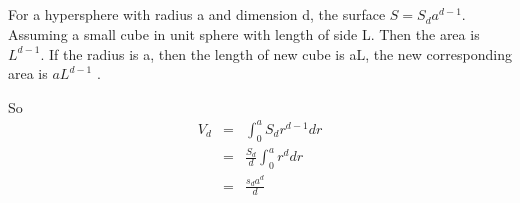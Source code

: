 \documentclass{article} %
\begin{document}







\subsection{}

For a hypersphere with radius a and dimension d, the surface $S = S_d a ^{d-1}$. Assuming a small cube in unit sphere with length of side L. Then the area is $L^{d-1}$. If the radius is a, then the length of new cube is aL, the new corresponding area is $aL^{d-1}$ .

So 
\begin{equation}
    \begin{array}{rcl}
     	V_d  & = &\int_{0}^{a}  S_d r^{d-1} dr \\
	& = & \frac{S_d}{d} \int_{0}^{a} r^d dr \\
	& = & \frac{s_d a^d}{d}
    \end{array}
\end{equation}
\end{document}
